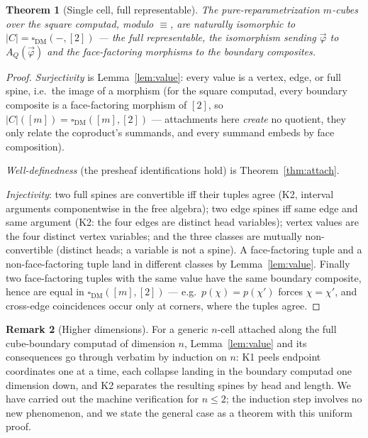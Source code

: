 \documentclass[11pt]{amsart}
\newtheorem{thm}{Theorem}[section]
\theoremstyle{definition}
\newtheorem{rem}[thm]{Remark}
\newcommand{\Dbox}{\square_{\mathrm{DM}}}
\newcommand{\aconv}{\equiv}
\newcommand{\act}[1]{A_{#1}}
\newcommand{\Real}[1]{|#1|}
\begin{document}
\begin{thm}[Single cell, full representable]\label{thm:single}
  The pure-reparametrization $m$-cubes over the square computad,
  modulo $\aconv$, are naturally isomorphic to
  $\Real{C} = \Dbox(-,[2])$ --- the \emph{full} representable, the
  isomorphism sending $\vec\varphi$ to $\act{Q}(\vec\varphi)$ and
  the face-factoring morphisms to the boundary composites.
\end{thm}
\begin{proof}
  \emph{Surjectivity} is Lemma~\ref{lem:value}: every value is a
  vertex, edge, or full spine, i.e.\ the image of a morphism (for
  the square computad, every boundary composite is a face-factoring
  morphism of $[2]$, so $\Real{C}([m]) = \Dbox([m],[2])$ ---
  attachments here \emph{create} no quotient, they only relate the
  coproduct's summands, and every summand embeds by face
  composition).

  \emph{Well-definedness} (the presheaf identifications hold) is
  Theorem~\ref{thm:attach}.

  \emph{Injectivity}: two full spines are convertible iff their
  tuples agree (K2, interval arguments componentwise in the free
  algebra); two edge spines iff same edge and same argument (K2:
  the four edges are distinct head variables); vertex values are
  the four distinct vertex variables; and the three classes are
  mutually non-convertible (distinct heads; a variable is not a
  spine).  A face-factoring tuple and a non-face-factoring tuple
  land in different classes by Lemma~\ref{lem:value}.  Finally two
  face-factoring tuples with the same value have the same boundary
  composite, hence are equal in $\Dbox([m],[2])$ --- e.g.\
  $p(\chi) = p(\chi')$ forces $\chi = \chi'$, and cross-edge
  coincidences occur only at corners, where the tuples agree.
\end{proof}

\begin{rem}[Higher dimensions]\label{rem:highdim}
  For a generic $n$-cell attached along the full cube-boundary
  computad of dimension $n$, Lemma~\ref{lem:value} and its
  consequences go through verbatim by induction on $n$: K1 peels
  endpoint coordinates one at a time, each collapse landing in the
  boundary computad one dimension down, and K2 separates the
  resulting spines by head and length.  We have carried out the
  machine verification for $n \le 2$; the induction step involves
  no new phenomenon, and we state the general case as a theorem
  with this uniform proof.
\end{rem}
\end{document}
